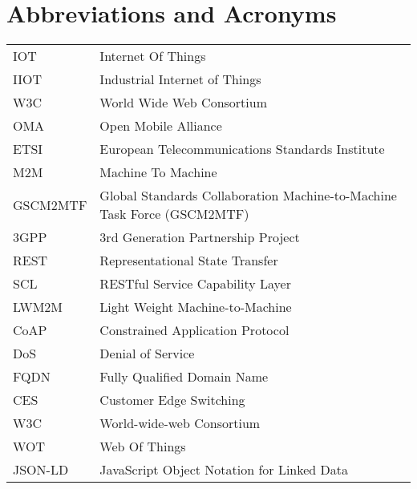 \chapter*{Abbreviations and Acronyms}


\noindent
\begin{longtable}{@{}p{}p{}@{}}
IOT & Internet Of Things \\
IIOT & Industrial Internet of Things \\
W3C & World Wide Web Consortium \\
OMA & Open Mobile Alliance \\
ETSI & European Telecommunications Standards Institute \\
M2M & Machine To Machine \\
GSCM2MTF & Global Standards Collaboration Machine-to-Machine Task Force (GSCM2MTF) \\
3GPP & 3rd Generation Partnership Project \\ 
REST & Representational State Transfer \\
SCL & RESTful Service Capability Layer \\
LWM2M & Light Weight Machine-to-Machine \\
CoAP & Constrained Application Protocol \\
DoS & Denial of Service \\  
FQDN & Fully Qualified Domain Name \\
CES & Customer Edge Switching \\
W3C & World-wide-web Consortium \\
WOT & Web Of Things \\
JSON-LD & JavaScript Object Notation for Linked Data \\

\end{longtable}

